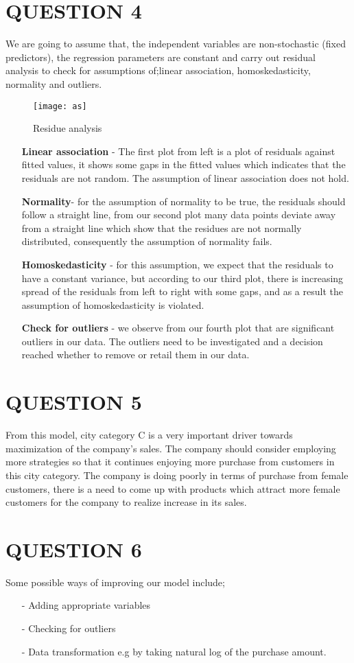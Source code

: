 \documentclass[12pt,a4paper]{article}
\begin{document}
\section*{QUESTION 4}
We are going to assume that, the independent variables are non-stochastic (fixed predictors), the regression parameters are constant and carry out residual analysis to check for assumptions of;linear association, homoskedasticity, normality and outliers.
\begin{figure}[H]
\texttt{[image: as]}
\centering
\caption{Residue analysis}
\end{figure}
\begin{enumerate}
\item[]\textbf{Linear association} - The first plot from left is a plot of residuals against fitted values, it shows some gaps in the fitted values which indicates that the residuals are not random. The assumption of linear association does not hold.
\item[]\textbf{Normality}- for the assumption of normality to be true, the residuals should follow a straight line, from our second plot many data points deviate away from a straight line which show that the residues are not normally distributed, consequently the assumption of normality fails.
\item[]\textbf{Homoskedasticity} - for this assumption, we expect that the residuals to have a constant variance, but according to our third plot, there is increasing spread of the residuals from left to right with some gaps, and as a result the assumption of homoskedasticity is violated.
\item[]\textbf{Check for outliers} - we observe from our fourth plot that are significant outliers in our data. The outliers need to be investigated and a decision reached whether to remove or retail them in our data. 
\end{enumerate}
\section*{QUESTION 5}
From this model, city category C is a very important driver towards maximization of the company's sales. The company should consider employing more strategies so that it continues enjoying more purchase from customers in this city category. The company is doing poorly in terms of purchase from female customers, there is a need to come up with products which attract more female customers for the company to realize increase in its sales.
\section*{QUESTION 6}
Some possible ways of improving our model include;
\begin{enumerate}
\item[-]Adding appropriate variables
\item[-]Checking for outliers
\item[-]Data transformation e.g by taking natural log of the purchase amount.
\end{enumerate} 
\end{document}
